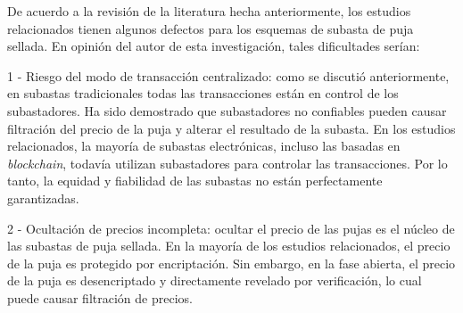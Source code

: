 

    De acuerdo a la revisión de la literatura hecha anteriormente, los estudios relacionados tienen algunos defectos para los 
    esquemas de subasta de puja sellada. En opinión del autor de esta investigación, tales dificultades serían:

    1 - Riesgo del modo de transacción centralizado: como se discutió anteriormente, en subastas 
    tradicionales todas las transacciones
    están en control de los subastadores. Ha sido demostrado que subastadores no confiables pueden causar filtración del precio de la puja
    y alterar el resultado de la subasta. En los estudios relacionados, la mayoría de subastas electrónicas, incluso las basadas en 
    \textit{blockchain}, todavía utilizan subastadores para controlar las transacciones. Por lo tanto, la equidad y fiabilidad de las 
    subastas no están perfectamente garantizadas.

    2 - Ocultación de precios incompleta: ocultar el precio de las pujas es el núcleo de las subastas de puja sellada. En la mayoría de los estudios 
    relacionados, el precio de la puja es protegido por encriptación. Sin embargo, en la fase abierta, el precio de la puja es desencriptado
    y directamente revelado por verificación, lo cual puede causar filtración de precios.

